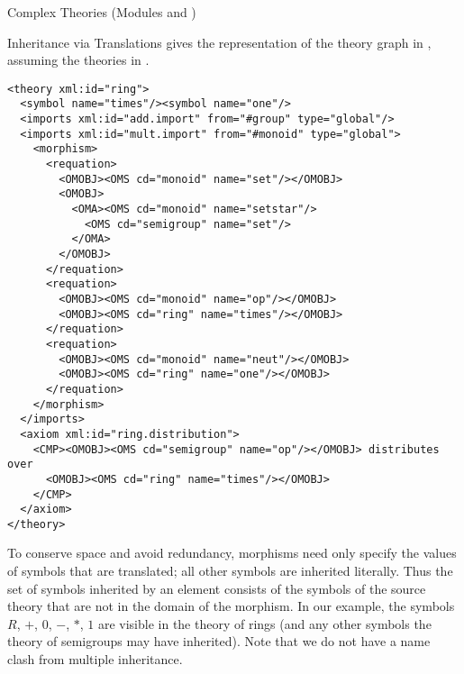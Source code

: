 \begin{tchapter}[id=complex-theories,short=Complex Theories]{Complex Theories (Modules
    {} and {})}
\begin{tsection}[id=morphisms]{Inheritance via Translations}
{} gives the {\omdoc} representation of the theory graph in
{}, assuming the theories in {}.

\begin{lstlisting}[label=lst:rings,
  caption={A Theory of Rings by Inheritance Via Renaming},
  index={derive,method,premise}]
<theory xml:id="ring"> 
  <symbol name="times"/><symbol name="one"/> 
  <imports xml:id="add.import" from="#group" type="global"/>
  <imports xml:id="mult.import" from="#monoid" type="global"> 
    <morphism> 
      <requation> 
        <OMOBJ><OMS cd="monoid" name="set"/></OMOBJ>
        <OMOBJ>
          <OMA><OMS cd="monoid" name="setstar"/>
            <OMS cd="semigroup" name="set"/>
          </OMA>
        </OMOBJ>
      </requation> 
      <requation> 
        <OMOBJ><OMS cd="monoid" name="op"/></OMOBJ>
        <OMOBJ><OMS cd="ring" name="times"/></OMOBJ>
      </requation> 
      <requation>
        <OMOBJ><OMS cd="monoid" name="neut"/></OMOBJ>
        <OMOBJ><OMS cd="ring" name="one"/></OMOBJ>
      </requation> 
    </morphism> 
  </imports> 
  <axiom xml:id="ring.distribution"> 
    <CMP><OMOBJ><OMS cd="semigroup" name="op"/></OMOBJ> distributes over 
      <OMOBJ><OMS cd="ring" name="times"/></OMOBJ> 
    </CMP> 
  </axiom>
</theory>
\end{lstlisting}

To conserve space and avoid redundancy, {\omdoc} morphisms need only specify the values of
symbols that are translated; all other symbols are inherited literally.  Thus the set of
symbols inherited by an {} element consists of the symbols of the source
theory that are not in the domain of the morphism. In our example, the symbols $R$, $+$,
$0$, $-$, $*$, $1$ are visible in the theory of rings (and any other symbols the theory of
semigroups may have inherited). Note that we do not have a name clash from multiple
inheritance.
  

\end{tsection}
\end{tchapter}
